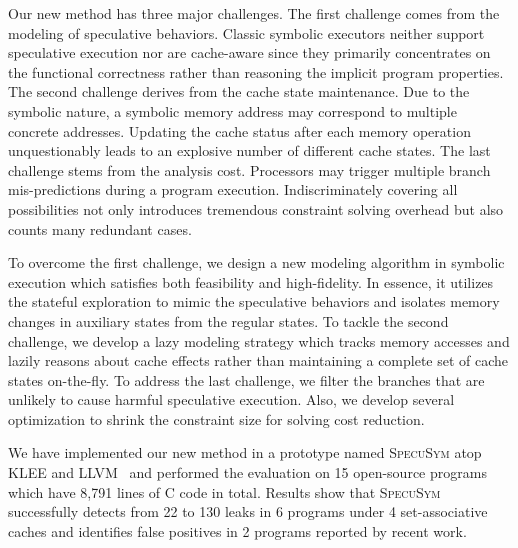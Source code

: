 \documentclass[sigconf]{acmart}
\newcommand\ignore[1]{}
\newcommand{\SpecuSym}{\textsc{SpecuSym} }
\begin{document}
Our new method has three major challenges. The first challenge comes from the 
modeling of speculative behaviors. Classic symbolic executors
\cite{CadarDE08,PasareanuR10} 
neither support speculative execution nor are cache-aware since they primarily 
concentrates on the functional correctness rather than reasoning the implicit 
program properties. 
%
The second challenge derives from the cache state maintenance. Due to the symbolic 
nature, a symbolic memory address may correspond to multiple concrete addresses. 
Updating the cache status after each memory operation unquestionably leads to an 
explosive number of different cache states. 
%
The last challenge stems from the analysis cost. Processors may trigger multiple 
branch mis-predictions during a program execution. Indiscriminately covering all 
possibilities not only introduces tremendous constraint solving overhead but also 
counts many redundant cases. 


To overcome the first challenge, we design a new modeling algorithm in symbolic 
execution which satisfies both feasibility and high-fidelity. In essence, it 
utilizes the stateful exploration to mimic the speculative behaviors and isolates 
memory changes in auxiliary states from the regular states. 
%
To tackle the second challenge, we develop a lazy modeling strategy which tracks 
memory accesses and lazily reasons about cache effects rather than maintaining a 
complete set of cache states on-the-fly. 
%
To address the last challenge, we filter the branches that are unlikely to cause 
harmful speculative execution. Also, we develop several optimization to shrink 
the constraint size for solving cost reduction.



\ignore{
Also, We develop a merging schema between the mimicked states and regular 
symbolic states to accumulate the cache side effects.

In general, we decompose the precise but lengthy constraint 
into smaller chunks without losing correctness, as well as utilizing 
executor kernel characteristics for faster computation.

However, the side effects caused by speculative execution are normally 
undetectable under standard symbolic execution. To overcome this problem,
we introduce the $\mathit{speculative~modeling}$ into symbolic execution. 
Thus, cache side effects are visible and cache timing leaks from speculative 
execution detectable now. 
}


We have implemented our new method in a prototype named \SpecuSym atop KLEE
\cite{CadarDE08} and LLVM~\cite{LattnerA04} and performed the evaluation on  
15 open-source programs which have 8,791 lines of C code in total. Results 
show that \SpecuSym successfully detects from 22 to 130 leaks in 6 programs 
under 4 set-associative caches and identifies false positives in 2 programs 
reported by recent work.
\end{document}
